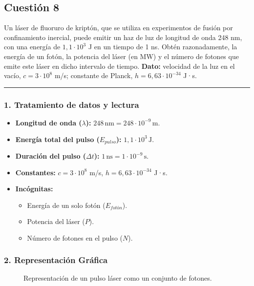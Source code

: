 \newpage
\subsection{Cuestión 8}
\label{subsec:C8_2024_jul_ext}

\begin{cajaenunciado}
Un láser de fluoruro de kriptón, que se utiliza en experimentos de fusión por confinamiento inercial, puede emitir un haz de luz de longitud de onda 248 nm, con una energía de $1,1 \cdot 10^{3}$ J en un tiempo de 1 ns. Obtén razonadamente, la energía de un fotón, la potencia del láser (en MW) y el número de fotones que emite este láser en dicho intervalo de tiempo.
\textbf{Dato:} velocidad de la luz en el vacío, $c=3\cdot10^{8}$ m/s; constante de Planck, $h=6,63\cdot10^{-34}$ J·s.
\end{cajaenunciado}
\hrule

\subsubsection*{1. Tratamiento de datos y lectura}
\begin{itemize}
    \item \textbf{Longitud de onda ($\lambda$):} $248 \, \text{nm} = 248 \cdot 10^{-9} \, \text{m}$.
    \item \textbf{Energía total del pulso ($E_{pulso}$):} $1,1 \cdot 10^{3} \, \text{J}$.
    \item \textbf{Duración del pulso ($\Delta t$):} $1 \, \text{ns} = 1 \cdot 10^{-9} \, \text{s}$.
    \item \textbf{Constantes:} $c=3\cdot10^{8}$ m/s, $h=6,63\cdot10^{-34}$ J·s.
    \item \textbf{Incógnitas:}
    \begin{itemize}
        \item Energía de un solo fotón ($E_{fotón}$).
        \item Potencia del láser ($P$).
        \item Número de fotones en el pulso ($N$).
    \end{itemize}
\end{itemize}

\subsubsection*{2. Representación Gráfica}
\begin{figure}[H]
    \centering
    \caption{Representación de un pulso láser como un conjunto de fotones.}
\end{figure}

